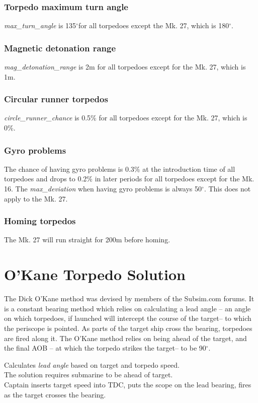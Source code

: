 \documentclass{article}
\newcommand{\degree}{$^{\circ}$}
\begin{document}
\subsubsection{Torpedo maximum turn angle}
\emph{max\_turn\_angle} is 135\degree for all torpedoes except the Mk. 27, which is 180\degree.

\subsubsection{Magnetic detonation range}
\emph{mag\_detonation\_range} is 2m for all torpedoes except for the Mk. 27, which is 1m.

\subsubsection{Circular runner torpedos}
\emph{circle\_runner\_chance} is 0.5\% for all torpedoes except for the Mk. 27, which is 0\%.

\subsubsection{Gyro problems}
The chance of having gyro problems is 0.3\% at the introduction time of all torpedoes and drops to 0.2\% in later periods for all torpedoes except for the Mk. 16. The \emph{max\_deviation} when having gyro problems is always 50\degree. This does not apply to the Mk. 27. 

\subsubsection{Homing torpedos}
The Mk. 27 will run straight for 200m before homing.



\section{O'Kane Torpedo Solution}
The Dick O'Kane method was devised by members of the Subsim.com\cite{subsim} forums. It is a constant bearing method which relies on calculating a lead angle -- an angle on which torpedoes, if launched will intercept the course of the target-- to which the periscope is pointed. As parts of the target ship cross the bearing, torpedoes are fired along it. The O'Kane method relies on being ahead of the target, and the final AOB -- at which the torpedo strikes the target-- to be 90\degree .

Calculates \emph{lead angle} based on target and torpedo speed.\\
The solution requires submarine to be ahead of target.\\
Captain inserts target speed into TDC, puts the scope on the lead bearing, fires as the target crosses the bearing.
\end{document}
